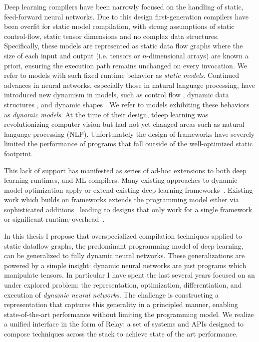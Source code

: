 Deep learning compilers have been narrowly focused
  on the handling of static, feed-forward neural networks.
Due to this design first-generation compilers have been overfit
  for static model compilation, with strong assumptions of static control-flow,
  static tensor dimensions and no complex data structures.
Specifically, these models are represented as static data flow graphs where the
  size of each input and output (i.e. tensors or $n$-dimensional arrays) are known a priori,
  ensuring the execution path remains unchanged on every invocation.
We refer to models with such fixed runtime behavior as \emph{static models}.
Continued advances in neural networks, especially those in natural language processing,
  have introduced new dynamism in models, such as control flow \citep{lstm, language_model},
  dynamic data structures \citep{tree_lstm, graph_lstm}, and dynamic shapes \citep{devlin2018bert}.
  We refer to models exhibiting these behaviors as {\em dynamic models}.
At the time of their design, tdeep learning was revolutionizing
  computer vision but had not yet changed areas such as natural language processing (NLP).
Unfortunately the design of frameworks have severely limited the performance
  of programs that fall outside of the well-optimized static footprint.

This lack of support has manifested as series of ad-hoc extensions to
  both deep learning runtimes, and ML compilers.
Many existing approaches to dynamic model optimization apply or
  extend existing deep learning frameworks~\citep{xu2018cavs, gao2018low, yu2018dynamic, jeong2018improving, jeong2019janus, dynet, tf_fold}.
Existing work which builds on frameworks extends the programming model either via
  sophisticated additions~\citep{yu2018dynamic} leading to designs that only work
  for a single framework or significant runtime overhead~\citep{tf_fold, jeong2019janus}.

In this thesis I propose that overspecialized
  compilation techniques applied to static dataflow graphs,
  the predominant programming model of deep learning,
  can be generalized to fully dynamic neural networks.
These generalizations are powered by a simple insight:
  dynamic neural networks are just programs which manipulate tensors.
In particular I have spent the last several years focused on an under explored problem:
  the representation,
  optimization,
  differentiation,
  and execution of \emph{dynamic neural networks}.
The challenge is constructing a representation that captures this generality
  in a principled manner, enabling state-of-the-art performance without limiting the programming model.
We realize a unified interface in the form of Relay: a set of systems and APIs designed
  to compose techniques across the stack to achieve state of the art performance.


